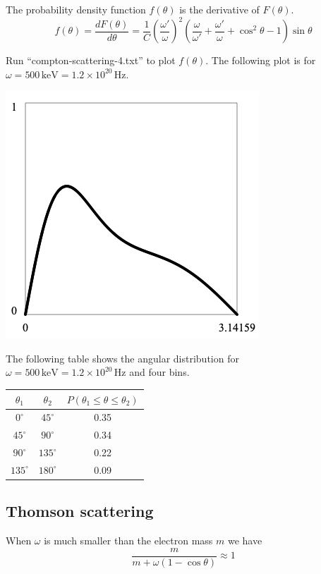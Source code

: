 \documentclass[12pt]{article}
\begin{document}
\noindent
The probability density function $f(\theta)$ is the derivative of $F(\theta)$.
\begin{equation*}
f(\theta)=\frac{dF(\theta)}{d\theta}
=\frac{1}{C}
\left(\frac{\omega'}{\omega}\right)^2
\left(\frac{\omega}{\omega'}+\frac{\omega'}{\omega}+\cos^2\theta-1\right)
\sin\theta
\end{equation*}

\noindent
Run ``compton-scattering-4.txt'' to plot $f(\theta)$.
The following plot is for $\omega=500\,\text{keV}=1.2\times10^{20}\,\text{Hz}$.

\begin{center}
\includegraphics[scale=0.5]{compton-scattering.png}
\end{center}

\noindent
The following table shows the angular distribution for
$\omega=500\,\text{keV}=1.2\times10^{20}\,\text{Hz}$ and four bins.

\begin{center}
\begin{tabular}{|c|c|c|}
\hline
$\theta_1$ & $\theta_2$ & $P(\theta_1\le\theta\le\theta_2)$\\
\hline
$0^\circ$ & $45^\circ$ & 0.35 \\
$45^\circ$ & $90^\circ$ & 0.34 \\
$90^\circ$ & $135^\circ$ & 0.22 \\
$135^\circ$ & $180^\circ$ & 0.09 \\
\hline
\end{tabular}
\end{center}

\subsection*{Thomson scattering}
When $\omega$ is much smaller than the electron mass $m$ we have
\begin{equation*}
\frac{m}{m+\omega(1-\cos\theta)}\approx1
\end{equation*}
\end{document}
